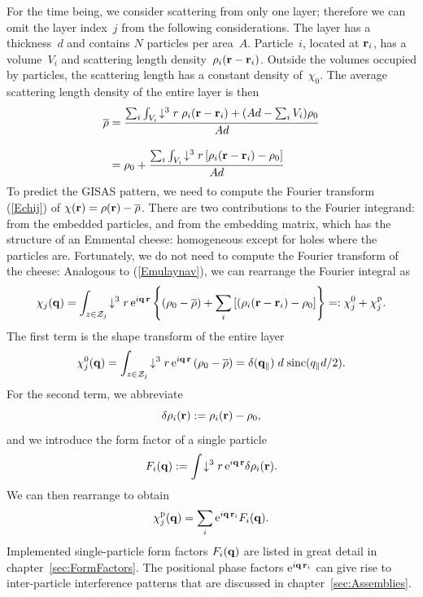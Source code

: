 For the time being,
we consider scattering from only one layer;
therefore we can omit the layer index~$j$ from the following considerations.
The layer has a thickness~$d$ and contains $N$ particles per area~$A$.
Particle~$i$, located at $\mathbf{r}_i$,
has a volume~$V_i$ and scattering length density~$\rho_i(\mathbf{r}-\mathbf{r}_i)$.
Outside the volumes occupied by particles,
the scattering length has a constant density of~$\chi_0$.
The average scattering length density of the entire layer is then
\begin{equation}\label{Emulaynav}
  \begin{split}
  \overline{\rho}
      &= \frac{\sum_i \int_{V_i}\!\downarrow^3r\; \rho_i(\mathbf{r}-\mathbf{r}_i)
               + (Ad-\sum_i V_i)\rho_0}
             {Ad}\\[1em]
      &= \rho_0 + \frac{\sum_i \int_{V_i}\!\downarrow^3r\, [\rho_i(\mathbf{r}-\mathbf{r}_i)-\rho_0]}
             {Ad}
  \end{split}
\end{equation}
To predict the GISAS pattern,
we need to compute the Fourier transform (\ref{Echij}) of
$\chi(\mathbf{r})=\rho(\mathbf{r})-\overline{\rho}$.
There are two contributions to the Fourier integrand:
from the embedded particles, and from the embedding matrix,
which has the structure of an Emmental cheese:
homogeneous except for holes where the particles are.
Fortunately, we do not need to compute the Fourier transform
of the cheese:
Analogous to (\ref{Emulaynav}),
we can rearrange the Fourier integral as
\begin{equation}\label{Echijre}
  \chi_j(\mathbf{q})
  = \int_{z\in\mathcal{Z}_j}\!\downarrow^3r\, \text{e}^{i\mathbf{q}\,\mathbf{r}}
    \left\{ \left(\rho_0-\overline{\rho}\right)
           + \sum_i \left[(\rho_i(\mathbf{r}-\mathbf{r}_i)-\rho_0\right] \right\}
  =: \chi^0_j + \chi^\text{p}_j.
\end{equation}
The first term is the shape transform of the entire layer
\begin{equation}
  \chi^0_j(\mathbf{q})
   = \int_{z\in\mathcal{Z}_j}\!\downarrow^3r\, \text{e}^{i\mathbf{q}\,\mathbf{r}}
      \left(\rho_0-\overline{\rho}\right)
   = \delta(\mathbf{q}_\parallel)\;d\;\text{sinc}(q_\parallel d/2).
\end{equation}
%
For the second term,
we abbreviate
\begin{equation}
  \delta\rho_i(\mathbf{r}):=\rho_i(\mathbf{r})-\rho_0,
\end{equation}
and we introduce the form factor of a single particle
\begin{equation}
  F_i(\mathbf{q}) := \int\!\downarrow^3r\, \text{e}^{i\mathbf{q}\,\mathbf{r}} \delta\rho_i(\mathbf{r}).
\end{equation}
We can then rearrange to obtain
\begin{equation}
  \chi^\text{p}_j(\mathbf{q})
  = \sum_i \text{e}^{i\mathbf{q}\,\mathbf{r}_i} F_i(\mathbf{q}).
\end{equation}
Implemented single-particle form factors $F_i(\mathbf{q})$
are listed in great detail in chapter~\ref{sec:FormFactors}.
The positional phase factors $\text{e}^{i\mathbf{q}\,\mathbf{r}_i}$
can give rise to inter-particle interference patterns
that are discussed in chapter~\ref{sec:Assemblies}.


